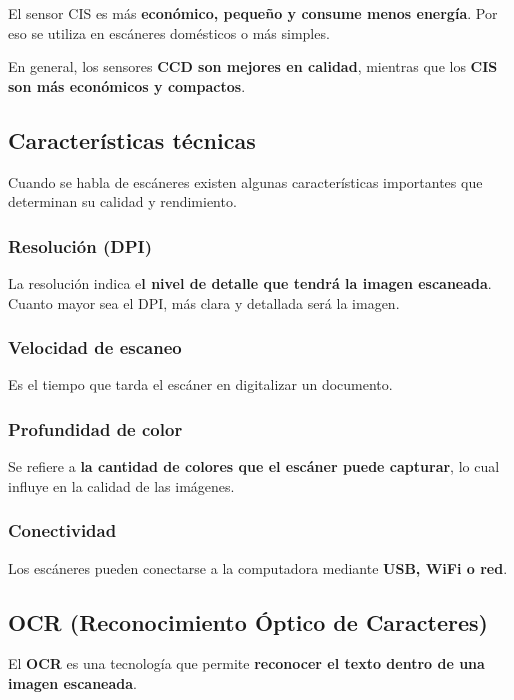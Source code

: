 \documentclass[12pt, letterpaper]{article}
\begin{document}
El sensor CIS es más \textbf{económico, pequeño y consume menos energía}.
Por eso se utiliza en escáneres domésticos o más simples.

En general, los sensores \textbf{CCD son mejores en calidad}, mientras que los \textbf{CIS son más económicos y compactos}.

\subsection{Características técnicas}

Cuando se habla de escáneres existen algunas características importantes que determinan su calidad y rendimiento.

\subsubsection{Resolución (DPI)}

La resolución indica e\textbf{l nivel de detalle que tendrá la imagen escaneada}.
Cuanto mayor sea el DPI, más clara y detallada será la imagen.

\subsubsection{Velocidad de escaneo}

Es el tiempo que tarda el escáner en digitalizar un documento.

\subsubsection{Profundidad de color}

Se refiere a\textbf{ la cantidad de colores que el escáner puede capturar}, lo cual influye en la calidad de las imágenes.

\subsubsection{Conectividad}

Los escáneres pueden conectarse a la computadora mediante \textbf{USB, WiFi o red}.

\subsection{OCR (Reconocimiento Óptico de Caracteres)}

El \textbf{OCR} es una tecnología que permite \textbf{reconocer el texto dentro de una imagen escaneada}.
\end{document}
